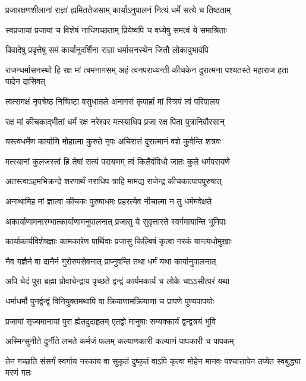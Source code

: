 \twolineshloka
{प्रजारक्षणशीलानां राज्ञां ह्यमिततेजसाम्}
{कार्याऽनुपालनं नित्यं धर्मे सत्ये च तिष्ठताम्}


\twolineshloka
{स्वप्रजायां प्रजायां च विशेषं नाधिगच्छताम्}
{प्रियेष्वपि च वध्येषु समत्वं ये समाश्रिताः}


\twolineshloka
{विवादेषु प्रवृत्तेषु समं कार्यानुदर्शिना}
{राज्ञा धर्मासनस्थेन जितौ लोकावुभावपि}


\onelineshloka
{राजन्धर्मासनस्थो हि रक्ष मां त्वमनागसम्}
\twolineshloka
{अहं त्वनपराध्यन्ती कीचकेन दुरात्मना}
{पश्यतस्ते महाराज हता पादेन दासिवत्}


\twolineshloka
{त्वत्समक्षं नृपश्रेष्ठ निष्पिष्टा वसुधातले}
{अनागसं कृपार्हां मां स्त्रियं त्वं परिपालय}


\twolineshloka
{रक्ष मां कीचकाद्भीतां धर्मं रक्ष नरेश्वर}
{मत्स्याधिप प्रजा रक्ष पिता पुत्रानिवौरसान्}


\twolineshloka
{यस्त्वधर्मेण कार्याणि मोहात्मा कुरुते नृपः}
{अचिरात्तं दुरात्मानं वशे कुर्वन्ति शत्रवः}


\twolineshloka
{मत्स्यानां कुलजस्त्वं हि तेषां सत्यं परायणम्}
{त्वं किलैवंविधो जातः कुले धर्मपरायणे}


\twolineshloka
{अतस्त्वाऽहमभिक्रन्दे शरणार्थं नराधिप}
{त्राहि मामद्य राजेन्द्र कीचकात्पापपूरुषात्}


\twolineshloka
{अनाथामिह मां ज्ञात्वा कीचकः पुरुषाधमः}
{प्रहरत्येव नीचात्मा न तु धर्ममवेक्षते}


\twolineshloka
{अकार्याणामनारम्भात्कार्याणामनुपालनात्}
{प्रजासु ये सुवृत्तास्ते स्वर्गमायान्ति भूमिपाः}


\twolineshloka
{कार्याकार्यविशेषज्ञाः कामकारेण पार्थिवाः}
{प्रजासु किल्बिषं कृत्वा नरकं यान्त्यधोमुखाः}


\twolineshloka
{नैव यज्ञैर्न वा दानैर्न गुरोरुपसेवनात्}
{प्राप्नुवन्ति तथा धर्मं यथा कार्यानुपालनात्}


\twolineshloka
{अपि चेदं पुरा ब्रह्मा प्रोवाचेन्द्राय पृच्छते}
{द्वन्द्वं कार्यमकार्यं च लोके चाऽऽसीत्परं यथा}


\twolineshloka
{धर्माधर्मौ पुनर्द्वन्द्वं विनियुक्तमथापि वा}
{क्रियाणामक्रियाणां च प्रापणे पुण्यपापयोः}


\twolineshloka
{प्रजायां सृज्यमानायां पुरा ह्येतदुदाहृतम्}
{एतद्वो मानुषाः सम्यक्कार्यं द्वन्द्वत्रयं भुवि}


\twolineshloka
{अस्मिन्सुनीते दुर्नीते लभते कर्मजं फलम्}
{कल्याणकारी कल्याणं पापकारी च पापकम्}


\threelineshloka
{तेन गच्छति संसर्गं स्वर्गाय नरकाय वा}
{सुकृतं दुष्कृतं वाऽपि कृत्वा मोहेन मानवः}
{पश्चात्तापेन तप्येत स्वबुद्ध्या मरणं गतः}


